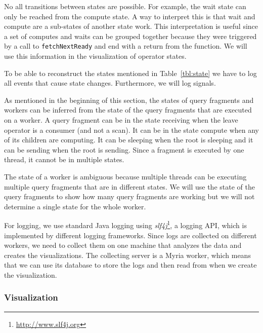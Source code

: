 \documentclass[11pt]{scrartcl}
\begin{document}
No all transitions between states are possible. For example, the wait state can only be reached from the compute state. A way to interpret this is that wait and compute are a sub-states of another state work. This interpretation is useful since a set of computes and waits can be grouped together because they were triggered by a call to \texttt{fetchNextReady} and end with a return from the function. We will use this information in the visualization of operator states.

To be able to reconstruct the states mentioned in Table~\ref{tbl:state} we have to log all events that cause state changes. Furthermore, we will log signals. %

As mentioned in the beginning of this section, the states of query fragments and workers can be inferred from the state of the query fragments that are executed on a worker. A query fragment can be in the state receiving when the leave operator is a consumer (and not a scan). It can be in the state compute when any of its children are computing. It can be sleeping when the root is sleeping and it can be sending when the root is sending. Since a fragment is executed by one thread, it cannot be in multiple states.

The state of a worker is ambiguous because multiple threads can be executing multiple query fragments that are in different states. We will use the state of the query fragments to show how many query fragments are working but we will not determine a single state for the whole worker.


For logging, we use standard Java logging using \emph{slf4j}\footnote{\url{http://www.slf4j.org}}, a logging API, which is implemented by different logging frameworks. Since logs are collected on different workers, we need to collect them on one machine that analyzes the data and creates the visualizations. The collecting server is a Myria worker, which means that we can use its database to store the logs and then read from when we create the visualization.


\subsubsection{Visualization}
\label{sec:visualization}
\end{document}
